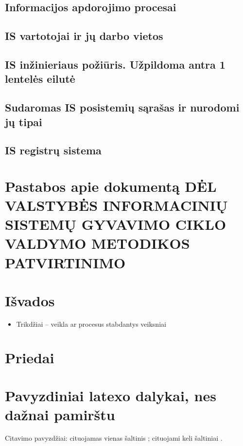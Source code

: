 \documentclass{VUMIFPSkursinis}
\begin{document}
\newpage
\subsection{Informacijos apdorojimo procesai}

\newpage
\subsection{IS vartotojai ir jų darbo vietos}

\newpage
\subsection{IS inžinieriaus požiūris. Užpildoma antra 1 lentelės eilutė}

\newpage
\subsection{Sudaromas IS posistemių sąrašas ir nurodomi jų tipai}

\newpage
\subsection{IS registrų sistema}

\newpage
\section{Pastabos apie dokumentą DĖL VALSTYBĖS INFORMACINIŲ SISTEMŲ GYVAVIMO CIKLO VALDYMO METODIKOS PATVIRTINIMO}

\newpage

\section{Išvados}

\newpage
{}
\begin{itemize}
	\item{Trikdžiai -- veikla ar procesus stabdantys veiksniai}
\end{itemize}

\section{Priedai}

\newpage
\section{Pavyzdiniai latexo dalykai, nes dažnai pamirštu}
Citavimo pavyzdžiai: cituojamas vienas šaltinis \cite{PvzStraipsnLt}; cituojami
keli šaltiniai \cite{PvzStraipsnEn, PvzKonfLt, PvzKonfEn, PvzKnygLt, PvzKnygEn,
PvzElPubLt, PvzElPubEn, PvzMagistrLt, PvzPhdEn}.
\end{document}
